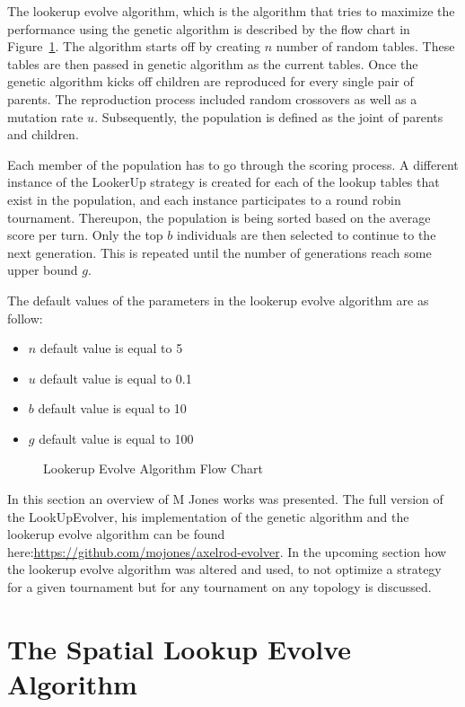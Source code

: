 The lookerup evolve algorithm, which is the algorithm that tries to maximize
the performance using the genetic algorithm is described by the flow chart in
Figure~\ref{fig:flookerup-evolve-flow}. The algorithm starts off by creating
\(n\) number of random tables. These tables are then passed in genetic algorithm
as the current tables.
Once the genetic algorithm kicks off children are reproduced for every single pair
of parents. The reproduction process included random crossovers as well as a
mutation rate \(u\). Subsequently, the population is defined as the joint of
parents and children.

Each member of the population has to go through the scoring process. A different
instance of the LookerUp strategy is created for each of the lookup tables that
exist in the population, and each instance participates to a round robin tournament.
Thereupon, the population is being sorted based on the average score per turn.
Only the top \(b\) individuals are then selected to continue to the next generation.
This is repeated until the number of generations reach some upper bound \(g\).

The default values of the parameters in the lookerup evolve algorithm are as
follow:
\begin{itemize}
  \item \(n\) default value is equal to 5
  \item \(u\) default value is equal to 0.1
  \item \(b\) default value is equal to 10
  \item \(g\) default value is equal to 100
\end{itemize}

\begin{figure}[!hbtp]
		
		\caption{Lookerup Evolve Algorithm Flow Chart}
  \label{fig:flookerup-evolve-flow}
\end{figure}

In this section an overview of M Jones works was presented. The full version
of the LookUpEvolver, his implementation of the genetic algorithm and the lookerup evolve
algorithm can be found here:\url{https://github.com/mojones/axelrod-evolver}.
In the upcoming section how the lookerup evolve algorithm was altered and used,
to not optimize a strategy for a given tournament but for any tournament on
any topology is discussed.

\section{The Spatial Lookup Evolve Algorithm}

